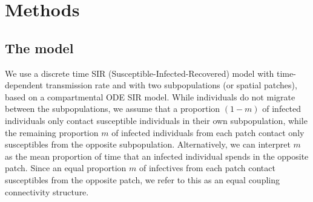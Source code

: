 \documentclass[12pt]{article}
\begin{document}
\section{Methods} \label{sec:methods}
\subsection{The model} \label{ss:deter_model}
We use a discrete time SIR (Susceptible-Infected-Recovered) model with time-dependent transmission rate and with two subpopulations (or spatial patches), based on a compartmental ODE SIR model. While individuals do not migrate between the subpopulations, we assume that a proportion $(1-m)$ of infected individuals only contact susceptible individuals in their own subpopulation, while the remaining proportion $m$ of infected individuals from each patch contact only susceptibles from the opposite subpopulation. Alternatively, we can interpret $m$ as the mean proportion of time that an infected individual spends in the opposite patch. Since an equal proportion $m$ of infectives from each patch contact susceptibles from the opposite patch, we refer to this as an equal coupling connectivity structure. 
\end{document}
